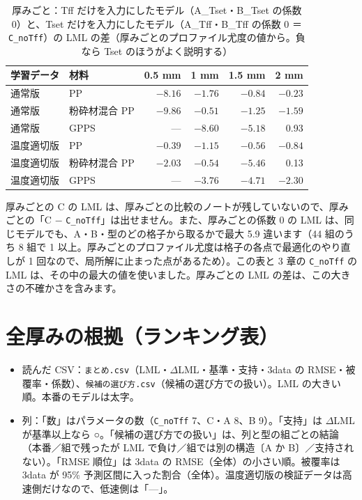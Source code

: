\documentclass[paper=a4paper,landscape,fontsize=10pt,line_length=62zw,number_of_lines=34]{jlreq}
\begin{document}
\begin{table}[H]\centering\footnotesize
\caption{厚みごと：Tff だけを入力にしたモデル（A\_Tset・B\_Tset の係数 0）と、Tset だけを入力にしたモデル（A\_Tff・B\_Tff の係数 0 ＝ \texttt{C\_\allowbreak{}noTff}）の LML の差（厚みごとのプロファイル尤度の値から。負なら Tset のほうがよく説明する）}\label{tab:tffthick}
\begin{tabular}{llrrrr}
\toprule
学習データ & 材料 & 0.5 mm & 1 mm & 1.5 mm & 2 mm \\
\midrule
通常版 & PP & $-8.16$ & $-1.76$ & $-0.84$ & $-0.23$ \\
通常版 & 粉砕材混合 PP & $-9.86$ & $-0.51$ & $-1.25$ & $-1.59$ \\
通常版 & GPPS & --- & $-8.60$ & $-5.18$ & 0.93 \\
温度適切版 & PP & $-0.39$ & $-1.15$ & $-0.56$ & $-0.84$ \\
温度適切版 & 粉砕材混合 PP & $-2.03$ & $-0.54$ & $-5.46$ & 0.13 \\
温度適切版 & GPPS & --- & $-3.76$ & $-4.71$ & $-2.30$ \\
\bottomrule
\end{tabular}
\end{table}
厚みごとの C の LML は、厚みごとの比較のノートが残していないので、厚みごとの「C $-$ \texttt{C\_\allowbreak{}noTff}」は出せません。また、厚みごとの係数 0 の LML は、同じモデルでも、A・B・型のどの格子から取るかで最大 5.9 違います（44 組のうち 8 組で 1 以上。厚みごとのプロファイル尤度は格子の各点で最適化のやり直しが 1 回なので、局所解に止まった点があるため）。この表と 3 章の \texttt{C\_\allowbreak{}noTff} の LML は、その中の最大の値を使いました。厚みごとの LML の差は、この大きさの不確かさを含みます。

\clearpage
\section{全厚みの根拠（ランキング表）}\label{sec:total}
\begin{itemize}[itemsep=0.2ex,topsep=0.3ex]
\item 読んだ CSV：\texttt{まとめ.csv}（LML・$\Delta$LML・基準・支持・3data の RMSE・被覆率・係数）、\texttt{候補の選び方.csv}（候補の選び方での扱い）。LML の大きい順。本番のモデルは太字。
\item 列：「数」はパラメータの数（\texttt{C\_\allowbreak{}noTff} 7、C・A 8、B 9）。「支持」は $\Delta$LML が基準以上なら ○。「候補の選び方での扱い」は、列と型の組ごとの結論（本番／組で残ったが LML で負け／組では別の構造〔A か B〕／支持されない）。「RMSE 順位」は 3data の RMSE（全体）の小さい順。被覆率は 3data が 95\% 予測区間に入った割合（全体）。温度適切版の検証データは高速側だけなので、低速側は「---」。
\end{itemize}
\end{document}

